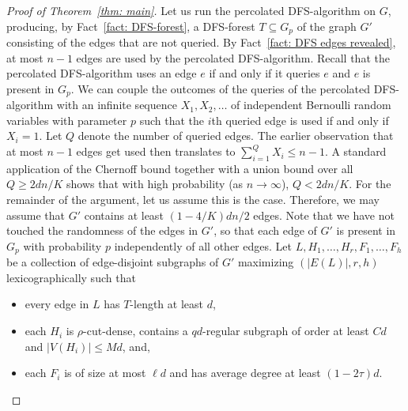 \documentclass[10pt]{article}
\theoremstyle{definition}
\let\leq\leqslant
\let\geq\geqslant
\begin{document}
\begin{proof}[Proof of Theorem~\ref{thm: main}]
Let us run the percolated DFS-algorithm on $G$, producing, by Fact~\ref{fact: DFS-forest}, a DFS-forest $T\subseteq G_p$ of the graph $G'$ consisting of the edges that are not queried. By Fact~\ref{fact: DFS edges revealed}, at most $n-1$ edges are used by the percolated DFS-algorithm. Recall that the percolated DFS-algorithm uses an edge $e$ if and only if it queries $e$ and $e$ is present in $G_p$. We can couple the outcomes of the queries of the percolated DFS-algorithm with an infinite sequence $X_1,X_2,\ldots$ of independent Bernoulli random variables with parameter $p$ such that the $i$th queried edge is used if and only if $X_i=1$. Let $Q$ denote the number of queried edges. The earlier observation that at most $n-1$ edges get used then translates to $\sum_{i=1}^QX_i\leq n-1$. A standard application of the Chernoff bound together with a union bound over all $Q\geq 2dn/K$ shows that with high probability (as $n\to \infty$), $Q< 2dn/K$. For the remainder of the argument, let us assume this is the case. Therefore, we may assume that $G'$ contains at least $(1-4/K)dn/2$ edges. Note that we have not touched the randomness of the edges in $G'$, so that each edge of $G'$ is present in $G_p$ with probability $p$ independently of all other edges. Let $L,H_1,\ldots,H_r,F_1,\ldots,F_h$ be a collection of edge-disjoint subgraphs of $G'$ maximizing $(|E(L)|,r,h)$ lexicographically such that
\begin{itemize}
    \item every edge in $L$ has $T$-length at least $d$,
    \item each $H_i$ is $\rho$-cut-dense, contains a $qd$-regular subgraph of order at least $Cd$ and $|V(H_i)|\leq Md$, and,
    \item each $F_i$ is of size at most $\ell d$ and has average degree at least $(1-2\tau)d$.
\end{itemize}

\end{proof}
\end{document}
